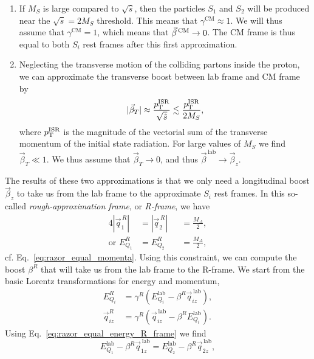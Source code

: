 \begin{enumerate}
  \item If $M_S$ is large compared to $\sqrt{\hat{s}}$, then the particles $S_1$ and $S_2$ will be
produced near the $\sqrt{\hat{s}} = 2 M_S$ threshold. This means that $\gamma^{\textrm{CM}} \approx
1$. We will thus assume that $\gamma^{\textrm{CM}} = 1$, which means that $\vec{\beta}^{\,\textrm{CM}} \rightarrow 0$. 
The CM frame is thus equal to both $S_i$ rest frames after this first approximation. 
  \item Neglecting the transverse motion of the colliding partons inside the proton, we can
approximate the transverse boost between lab frame and CM frame by 
  \begin{equation}
    |\vec{\beta}_T| \approx \frac{p_{\mathrm{T}}^{\rm ISR}}{\sqrt{\hat{s}}} \lesssim \frac{p_{\mathrm{T}}^{\rm
ISR}}{2M_S},
  \end{equation}
  where $p_{\mathrm{T}}^{\rm ISR}$ is the magnitude of the vectorial sum of the transverse momentum of the
initial state radiation. For large values of $M_S$ we find $\vec{\beta}_T \ll 1$. We thus assume
that $\vec{\beta}_T \rightarrow 0$, and thus $\vec{\beta}^{\,\textrm{lab}} \rightarrow
\vec{\beta}_z$.
\end{enumerate}
The results of these two approximations is that we only need a longitudinal boost $\vec{\beta}_z$
to take us from the lab frame to the approximate $S_i$ rest frames. 
In this so-called \textit{rough-approximation frame}, or \textit{R-frame}, we have 
\begin{alignat}{4}
  |\vec{q}^{\,R}_1|         &= |\vec{q}^{\,R}_2| &&= \frac{M_\Delta}{2} , \\
  \textrm{or } E_{Q_1}^R &= E_{Q_2}^R     &&= \frac{M_\Delta}{2},
\label{eq:razor_equal_energy_R_frame}
\end{alignat}
cf. Eq.~\ref{eq:razor_equal_momenta}. Using this constraint, we can compute the boost $\beta^R$
that will take us from the lab frame to the R-frame. We start from the basic Lorentz
transformations for energy and momentum, 
\begin{align}
  E_{Q_i}^R      &= \gamma^R \left( E_{Q_i}^{\textrm{lab}} - \beta^R \vec{q}_{iz}^{\,\textrm{lab}}
\right) , \\
  \vec{q}_{iz}^R &= \gamma^R \left( \vec{q}_{iz}^{\,\textrm{lab}} - \beta^R E_{Q_i}^{\textrm{lab}}
\right) .
\end{align}
Using Eq.~\ref{eq:razor_equal_energy_R_frame} we find
\begin{equation}
  E_{Q_1}^{\textrm{lab}} - \beta^R \vec{q}_{1z}^{\,\textrm{lab}} = E_{Q_2}^{\textrm{lab}} - \beta^R
\vec{q}_{2z}^{\,\textrm{lab}} ,
\end{equation}
